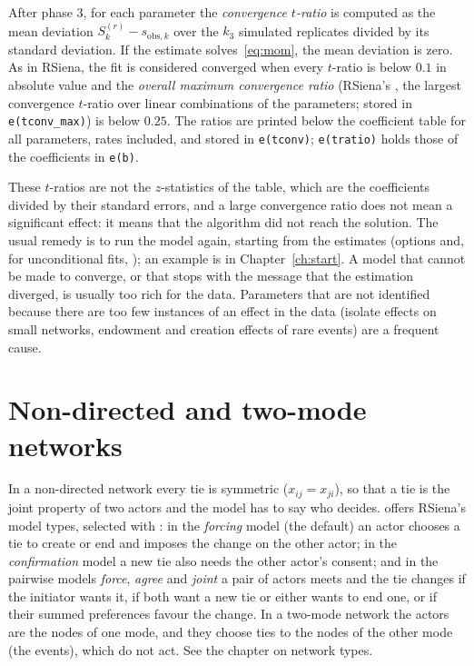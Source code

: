 After phase 3, for each parameter the \emph{convergence $t$-ratio} is computed as the mean deviation $S_k^{(r)}-s_{\mathrm{obs},k}$ over the $k_3$ simulated replicates divided by its standard deviation. If the estimate solves~\eqref{eq:mom}, the mean deviation is zero. As in RSiena, the fit is considered converged when every $t$-ratio is below $0.1$ in absolute value and the \emph{overall maximum convergence ratio} (RSiena's , the largest convergence $t$-ratio over linear combinations of the parameters; stored in \texttt{e(tconv\_max)}) is below $0.25$. The ratios are printed below the coefficient table for all parameters, rates included, and stored in \texttt{e(tconv)}; \texttt{e(tratio)} holds those of the coefficients in \texttt{e(b)}.

These $t$-ratios are not the $z$-statistics of the table, which are the coefficients divided by their standard errors, and a large convergence ratio does not mean a significant effect: it means that the algorithm did not reach the solution. The usual remedy is to run the model again, starting from the estimates (options  and, for unconditional fits, ); an example is in Chapter~\ref{ch:start}. A model that cannot be made to converge, or that stops with the message that the estimation diverged, is usually too rich for the data. Parameters that are not identified because there are too few instances of an effect in the data (isolate effects on small networks, endowment and creation effects of rare events) are a frequent cause.

\section{Non-directed and two-mode networks}

In a non-directed network every tie is symmetric ($x_{ij}=x_{ji}$), so that a tie is the joint property of two actors and the model has to say who decides. \nwsaom{} offers RSiena's model types, selected with : in the \emph{forcing} model (the default) an actor chooses a tie to create or end and imposes the change on the other actor; in the \emph{confirmation} model a new tie also needs the other actor's consent; and in the pairwise models \emph{force}, \emph{agree} and \emph{joint} a pair of actors meets and the tie changes if the initiator wants it, if both want a new tie or either wants to end one, or if their summed preferences favour the change. In a two-mode network the actors are the nodes of one mode, and they choose ties to the nodes of the other mode (the events), which do not act. See the chapter on network types.
